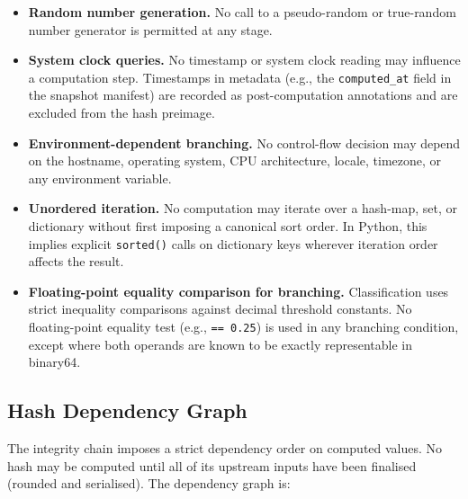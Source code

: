 \begin{itemize}
  \item \textbf{Random number generation.}  No call to a pseudo-random or
    true-random number generator is permitted at any stage.
  \item \textbf{System clock queries.}  No timestamp or system clock
    reading may influence a computation step.  Timestamps in metadata
    (e.g., the \texttt{computed\_at} field in the snapshot manifest) are
    recorded as post-computation annotations and are excluded from the
    hash preimage.
  \item \textbf{Environment-dependent branching.}  No control-flow decision
    may depend on the hostname, operating system, CPU architecture, locale,
    timezone, or any environment variable.
  \item \textbf{Unordered iteration.}  No computation may iterate over a
    hash-map, set, or dictionary without first imposing a canonical sort
    order.  In Python, this implies explicit \texttt{sorted()} calls on
    dictionary keys wherever iteration order affects the result.
  \item \textbf{Floating-point equality comparison for branching.}
    Classification uses strict inequality comparisons against decimal
    threshold constants.  No floating-point equality test
    (e.g., \texttt{==\,0.25}) is used in any branching condition, except
    where both operands are known to be exactly representable in binary64.
\end{itemize}

\subsection{Hash Dependency Graph}\label{sec:det:hash-graph}

The integrity chain imposes a strict dependency order on computed values.
No hash may be computed until all of its upstream inputs have been finalised
(rounded and serialised).  The dependency graph is:

